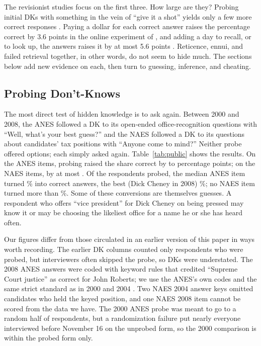 \documentclass[11pt]{article}
\begin{document}
The revisionist studies focus on the first three. How large are they? Probing initial DKs with something in the vein of ``give it a shot'' yields only a few more correct responses \citep{sturgis2008, luskin2011}. Paying a dollar for each correct answer raises the percentage correct by 3.6 points in the online experiment of \citet{prior2008}, and adding a day to recall, or to look up, the answers raises it by at most 5.6 points \citep[see also][]{bullock2015, prior2015}. Reticence, ennui, and failed retrieval together, in other words, do not seem to hide much. The sections below add new evidence on each, then turn to guessing, inference, and cheating.

\subsection{Probing Don't-Knows}

The most direct test of hidden knowledge is to ask again. Between 2000 and 2008, the ANES followed a DK to its open-ended office-recognition questions with ``Well, what's your best guess?'' and the NAES followed a DK to its questions about candidates' tax positions with ``Anyone come to mind?'' Neither probe offered options; each simply asked again. Table~\ref{tab:public} shows the results. On the ANES items, probing raised the share correct by \anesGainMin{} to \anesGainMax{} percentage points; on the NAES items, by at most \naesGainMax. Of the respondents probed, the median ANES item turned \anesConvertMedian\% into correct answers, the best (Dick Cheney in 2008) \anesConvertMax\%; no NAES item turned more than \naesConvertMax\%. Some of these conversions are themselves guesses. A respondent who offers ``vice president'' for Dick Cheney on being pressed may know it or may be choosing the likeliest office for a name he or she has heard often.

Our figures differ from those circulated in an earlier version of this paper in ways worth recording. The earlier DK columns counted only respondents who were probed, but interviewers often skipped the probe, so DKs were understated. The 2008 ANES answers were coded with keyword rules that credited ``Supreme Court justice'' as correct for John Roberts; we use the ANES's own codes and the same strict standard as in 2000 and 2004 \citep{krosnick2008}. Two NAES 2004 answer keys omitted candidates who held the keyed position, and one NAES 2008 item cannot be scored from the data we have. The 2000 ANES probe was meant to go to a random half of respondents, but a randomization failure put nearly everyone interviewed before November 16 on the unprobed form, so the 2000 comparison is within the probed form only.
\end{document}
